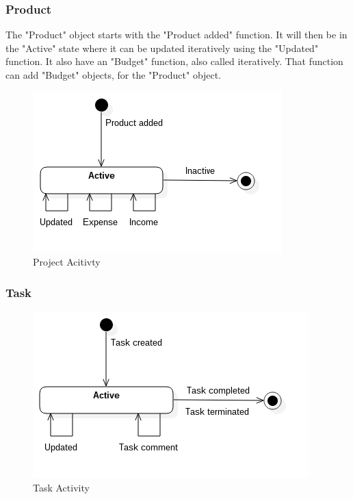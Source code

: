 \subsubsection*{Product}

The "Product" object starts with the "Product added" function. It will then be in the "Active" state where it can be updated iteratively using the "Updated" function. It also have an "Budget" function, also called iteratively. That function can add "Budget" objects, for the "Product" object.

\begin{figure}[H]
    \centering
    \includegraphics[scale=0.6]{Images/ProblemDomain/productActivityDiagram.png}
    \caption{Project Acitivty}
    \label{fig:productAcitvityDiagram}
\end{figure}

\subsubsection*{Task}

\begin{figure}[H]
    \centering
    \includegraphics[scale=0.6]{Images/ProblemDomain/taskActivityDiagram.png}
    \caption{Task Activity}
    \label{fig:taskActivityDiagram}
\end{figure}


